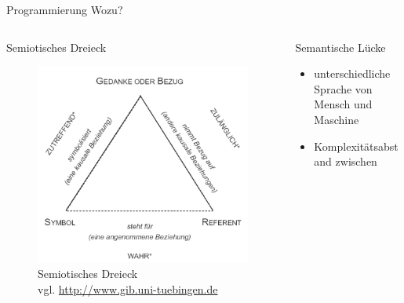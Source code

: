 \begin{frame}[shrink]{Programmierung Wozu?}
    \begin{columns}[t]
        \begin{column}{0.5\textwidth}
            \begin{block}{Semiotisches Dreieck}
                \begin{figure}
                \begin{center}\centering
                    \includegraphics[scale=0.18]{img/semiotdreieck.jpg}
                    \caption{Semiotisches Dreieck\\\tiny{vgl. \url{http://www.gib.uni-tuebingen.de}}}
                    \label{fig:semiotdreieck}
                \end{center}
                \end{figure}
            \end{block}
        \end{column}
        \begin{column}{0.5\textwidth}
            \begin{block}{Semantische Lücke}
                \begin{itemize}
                \item unterschiedliche Sprache von Mensch und Maschine
                \item Komplexitätsabstand zwischen \begin{itemize}

\end{itemize}
\end{itemize}
\end{block}
\end{column}
\end{columns}
\end{frame}
